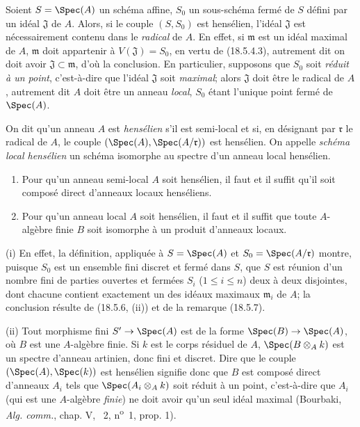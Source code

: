 \begin{remark}[18.5.7]
\label{IV.18.5.7}
Soient $S=\Spec(A)$ un schéma affine, $S_0$ un sous-schéma fermé de $S$ défini par un idéal $\mathfrak J$ de $A$. Alors, si le couple $(S,S_0)$ est hensélien, l'idéal $\mathfrak J$ est nécessairement contenu dans le \emph{radical} de $A$. En effet, si $\mathfrak m$ est un idéal maximal de $A$, $\mathfrak m$ doit appartenir à $V(\mathfrak J)=S_0$, en vertu de (18.5.4.3), autrement dit on doit avoir $\mathfrak J\subset\mathfrak m$, d'où la conclusion. En particulier, supposons que $S_0$ soit \emph{réduit à un point}, c'est-à-dire que l'idéal $\mathfrak J$ soit \emph{maximal}; alors $\mathfrak J$ doit être le radical de $A$, autrement dit $A$ doit être un anneau \emph{local}, $S_0$ étant l'unique point fermé de $\Spec(A)$.
\end{remark}

\begin{definition}[18.5.8]
On dit qu'un anneau $A$ est \emph{hensélien} s'il est semi-local et si, en désignant par $\mathfrak r$ le radical de $A$, le couple $(\Spec(A),\Spec(A/\mathfrak r))$ est hensélien. On appelle \emph{schéma local hensélien} un schéma isomorphe au spectre d'un anneau local hensélien.
\end{definition}

\begin{proposition}[18.5.9]
\label{IV.18.5.9}
\begin{enumerate}
  \item[(i)] Pour qu'un anneau semi-local $A$ soit hensélien, il faut et il suffit qu'il soit composé direct d'anneaux locaux henséliens.
  \item[(ii)] Pour qu'un anneau local $A$ soit hensélien, il faut et il suffit que toute $A$-algèbre finie $B$ soit isomorphe à un produit d'anneaux locaux.
\end{enumerate}
\end{proposition}

(i) En effet, la définition, appliquée à $S=\Spec(A)$ et $S_0=\Spec(A/\mathfrak r)$ montre, puisque $S_0$ est un ensemble fini discret et fermé dans $S$, que $S$ est réunion d'un nombre fini de parties ouvertes et fermées $S_i$ ($1\leq i\leq n$) deux à deux disjointes, dont chacune contient exactement un des idéaux maximaux $\mathfrak m_i$ de $A$; la conclusion résulte de (18.5.6, (ii)) et de la remarque (18.5.7).

(ii) Tout morphisme fini $S'\to\Spec(A)$ est de la forme $\Spec(B)\to\Spec(A)$, où $B$ est une $A$-algèbre finie. Si $k$ est le corps résiduel de $A$, $\Spec(B\otimes_A k)$ est un spectre d'anneau artinien, donc fini et discret. Dire que le couple $(\Spec(A),\Spec(k))$ est hensélien signifie donc que $B$ est composé direct d'anneaux $A_i$ tels que $\Spec(A_i\otimes_A k)$ soit réduit à un point, c'est-à-dire que $A_i$ (qui est une $A$-algèbre \emph{finie}) ne doit avoir qu'un seul idéal maximal (Bourbaki, \emph{Alg. comm.}, chap. V, \textsection~2, n\textsuperscript{o}~1, prop. 1).

